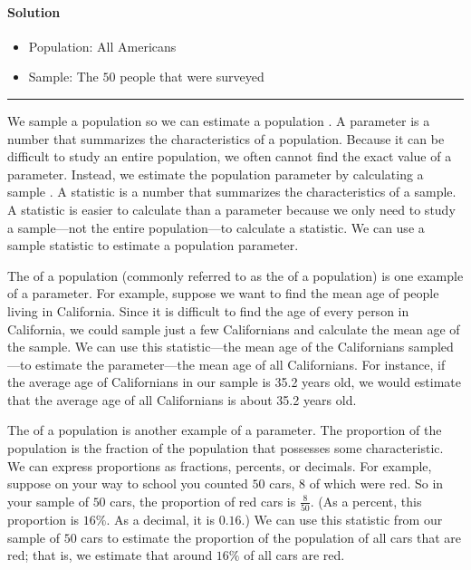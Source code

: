 \documentclass[letterpaper,10pt,english]{jupyterBook}
\begin{document}
\paragraph{Solution}
\label{\detokenize{Ch1 Sampling and Data/1.1 Key Terms in Statistics:solution}}\begin{itemize}
\item {} 
\sphinxAtStartPar
Population: All Americans

\item {} 
\sphinxAtStartPar
Sample: The \(50\) people that were surveyed

\end{itemize}


\bigskip\hrule\bigskip


\sphinxAtStartPar
We sample a population so we can estimate a population . A parameter is a number that summarizes the characteristics of a population. Because it can be difficult to study an entire population, we often cannot find the exact value of a parameter. Instead, we estimate the population parameter by calculating a sample . A statistic is a number that summarizes the characteristics of a sample. A statistic is easier to calculate than a parameter because we only need to study a sample—not the entire population—to calculate a statistic. We can use a sample statistic to estimate a population parameter.

\sphinxAtStartPar
The  of a population (commonly referred to as the  of a population) is one example of a parameter. For example, suppose we want to find the mean age of people living in California. Since it is difficult to find the age of every person in California, we could sample just a few Californians and calculate the mean age of the sample. We can use this statistic—the mean age of the Californians sampled—to estimate the parameter—the mean age of all Californians. For instance, if the average age of Californians in our sample is 35.2 years old, we would estimate that the average age of all Californians is about 35.2 years old.

\sphinxAtStartPar
The  of a population is another example of a parameter. The proportion of the population is the fraction of the population that possesses some characteristic. We can express proportions as fractions, percents, or decimals. For example, suppose on your way to school you counted \(50\) cars, \(8\) of which were red. So in your sample of \(50\) cars, the proportion of red cars is \(\frac{8}{50}\). (As a percent, this proportion is \(16\%\). As a decimal, it is \(0.16\).) We can use this statistic from our sample of \(50\) cars to estimate the proportion of the population of all cars that are red; that is, we estimate that around \(16\%\) of all cars are red.
\end{document}
